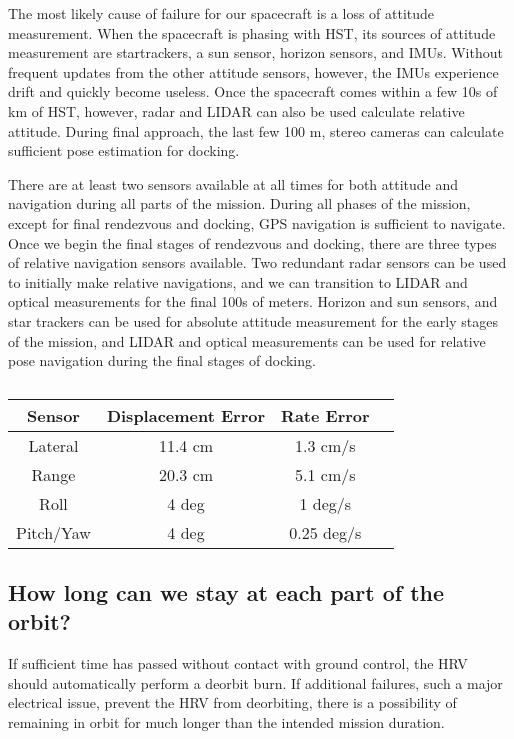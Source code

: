\documentclass[onecolumn,10pt]{jhwhw}
\begin{document}
The most likely cause of failure for our spacecraft is a loss of attitude measurement. When the spacecraft is phasing with HST, its sources of attitude measurement are startrackers, a sun sensor, horizon sensors, and IMUs. Without frequent updates from the other attitude sensors, however, the IMUs experience drift and quickly become useless. Once the spacecraft comes within a few 10s of km of HST, however, radar and LIDAR can also be used calculate relative attitude. During final approach, the last few 100 m, stereo cameras can calculate sufficient pose estimation for docking.

There are at least two sensors available at all times for both attitude and navigation during all parts of the mission. During all phases of the mission, except for final rendezvous and docking, GPS navigation is sufficient to navigate. Once we begin the final stages of rendezvous and docking, there are three types of relative navigation sensors available. Two redundant radar sensors can be used to initially make relative navigations, and we can transition to LIDAR and optical measurements for the final 100s of meters. Horizon and sun sensors, and star trackers can be used for absolute attitude measurement for the early stages of the mission, and LIDAR and optical measurements can be used for relative pose navigation during the final stages of docking.

\begin{table}[tb]
\begin{center}
\begin{tabular}{c c c c}
\toprule
Sensor & Displacement Error & Rate Error \\
\midrule
Lateral   & 11.4 cm & 1.3 cm/s \\
Range     & 20.3 cm & 5.1 cm/s \\
Roll      & 4 deg   & 1 deg/s \\
Pitch/Yaw & 4 deg   & 0.25 deg/s \\
\bottomrule
\end{tabular}
\end{center}
\caption{}
\end{table}


\subsection{How long can we stay at each part of the orbit?}

If sufficient time has passed without contact with ground control, the HRV should automatically perform a deorbit burn. If additional failures, such a major electrical issue, prevent the HRV from deorbiting, there is a possibility of remaining in orbit for much longer than the intended mission duration.
\end{document}
